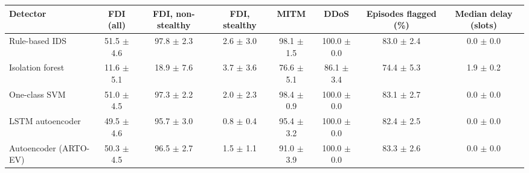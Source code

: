 \begin{tabular}{@{}lccccccc@{}}
\toprule
Detector & FDI (all) & FDI, non-stealthy & FDI, stealthy & MITM & DDoS & Episodes flagged (\%) & Median delay (slots) \\
\midrule
Rule-based IDS & 51.5 $\pm$ 4.6 & 97.8 $\pm$ 2.3 & 2.6 $\pm$ 3.0 & 98.1 $\pm$ 1.5 & 100.0 $\pm$ 0.0 & 83.0 $\pm$ 2.4 & 0.0 $\pm$ 0.0 \\
Isolation forest & 11.6 $\pm$ 5.1 & 18.9 $\pm$ 7.6 & 3.7 $\pm$ 3.6 & 76.6 $\pm$ 5.1 & 86.1 $\pm$ 3.4 & 74.4 $\pm$ 5.3 & 1.9 $\pm$ 0.2 \\
One-class SVM & 51.0 $\pm$ 4.5 & 97.3 $\pm$ 2.2 & 2.0 $\pm$ 2.3 & 98.4 $\pm$ 0.9 & 100.0 $\pm$ 0.0 & 83.1 $\pm$ 2.7 & 0.0 $\pm$ 0.0 \\
LSTM autoencoder & 49.5 $\pm$ 4.6 & 95.7 $\pm$ 3.0 & 0.8 $\pm$ 0.4 & 95.4 $\pm$ 3.2 & 100.0 $\pm$ 0.0 & 82.4 $\pm$ 2.5 & 0.0 $\pm$ 0.0 \\
Autoencoder (ARTO-EV) & 50.3 $\pm$ 4.5 & 96.5 $\pm$ 2.7 & 1.5 $\pm$ 1.1 & 91.0 $\pm$ 3.9 & 100.0 $\pm$ 0.0 & 83.3 $\pm$ 2.6 & 0.0 $\pm$ 0.0 \\
\bottomrule
\end{tabular}
